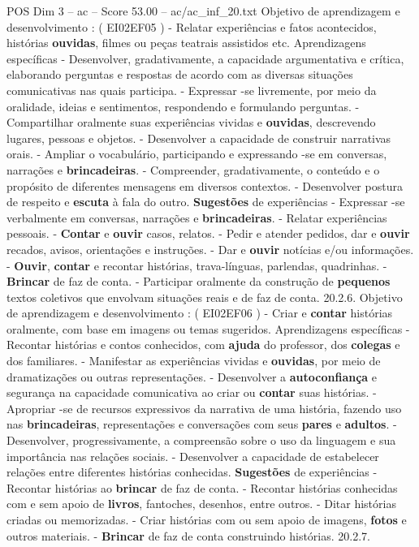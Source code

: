 \begin{textsample}{POS Dim 3 – ac – Score 53.00 – ac/ac\_inf\_20.txt}
Objetivo de aprendizagem e desenvolvimento : ( EI02EF05 ) - Relatar experiências e fatos acontecidos, histórias \textbf{ouvidas}, filmes ou peças teatrais assistidos etc.
Aprendizagens específicas - Desenvolver, gradativamente, a capacidade argumentativa e crítica, elaborando perguntas e respostas de acordo com as diversas situações comunicativas nas quais participa. - Expressar -se livremente, por meio da oralidade, ideias e sentimentos, respondendo e formulando perguntas. - Compartilhar oralmente suas experiências vividas e \textbf{ouvidas}, descrevendo lugares, pessoas e objetos. - Desenvolver a capacidade de construir narrativas orais. - Ampliar o vocabulário, participando e expressando -se em conversas, narrações e \textbf{brincadeiras}. - Compreender, gradativamente, o conteúdo e o propósito de diferentes mensagens em diversos contextos. - Desenvolver postura de respeito e \textbf{escuta} à fala do outro. \textbf{Sugestões} de experiências - Expressar -se verbalmente em conversas, narrações e \textbf{brincadeiras}. - Relatar experiências pessoais. - \textbf{Contar} e \textbf{ouvir} casos, relatos. - Pedir e atender pedidos, dar e \textbf{ouvir} recados, avisos, orientações e instruções. - Dar e \textbf{ouvir} notícias e/ou informações. - \textbf{Ouvir}, \textbf{contar} e recontar histórias, trava-línguas, parlendas, quadrinhas. - \textbf{Brincar} de faz de conta. - Participar oralmente da construção de \textbf{pequenos} textos coletivos que envolvam situações reais e de faz de conta. 20.2.6.
Objetivo de aprendizagem e desenvolvimento : ( EI02EF06 ) - Criar e \textbf{contar} histórias oralmente, com base em imagens ou temas sugeridos.
Aprendizagens específicas - Recontar histórias e contos conhecidos, com \textbf{ajuda} do professor, dos \textbf{colegas} e dos familiares. - Manifestar as experiências vividas e \textbf{ouvidas}, por meio de dramatizações ou outras representações. - Desenvolver a \textbf{autoconfiança} e segurança na capacidade comunicativa ao criar ou \textbf{contar} suas histórias. - Apropriar -se de recursos expressivos da narrativa de uma história, fazendo uso nas \textbf{brincadeiras}, representações e conversações com seus \textbf{pares} e \textbf{adultos}. - Desenvolver, progressivamente, a compreensão sobre o uso da linguagem e sua importância nas relações sociais. - Desenvolver a capacidade de estabelecer relações entre diferentes histórias conhecidas. \textbf{Sugestões} de experiências - Recontar histórias ao \textbf{brincar} de faz de conta. - Recontar histórias conhecidas com e sem apoio de \textbf{livros}, fantoches, desenhos, entre outros. - Ditar histórias criadas ou memorizadas. - Criar histórias com ou sem apoio de imagens, \textbf{fotos} e outros materiais. - \textbf{Brincar} de faz de conta construindo histórias. 20.2.7.

\end{textsample}
